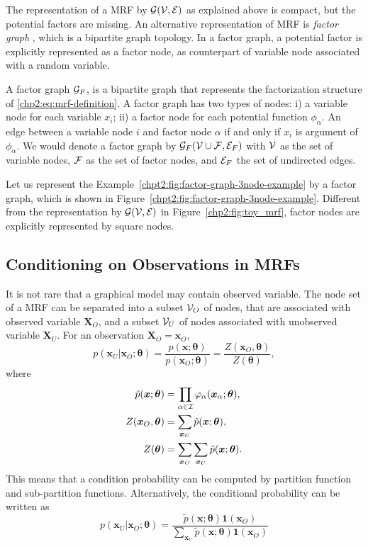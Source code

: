The representation of a MRF by $\mathcal{G}(\mathcal{V}, \mathcal{E})$ as explained above is compact, but the potential factors are missing. An alternative representation of MRF is \textit{factor graph} \cite{kschischang2001factor_graph},
which is a bipartite graph topology. In a factor graph, a potential factor is explicitly represented as a factor node, as counterpart of variable node associated with a random variable.
\begin{definition}\label{chpt2:def:factor-graph}
  A factor graph $\mathcal{G}_F$, is a bipartite graph that represents the factorization structure of \eqref{chp2:eq:mrf-definition}. A factor graph has two types of nodes: i) a variable node for each variable $x_i$; ii) a factor node for each potential function $\phi_{\alpha}$. An edge between a variable node $i$ and factor node $\alpha$ if and only if $x_i$ is argument of $\phi_{\alpha}$. We would denote a factor graph by $\mathcal{G}_F(\mathcal{V} \cup \mathcal{F}, \mathcal{E}_F)$ with $\mathcal{V}$ as the set of variable nodes, $\mathcal{F}$ as the set of factor nodes, and $\mathcal{E}_F$ the set of undirected edges.
\end{definition}
\begin{example}
  Let us represent the Example~\ref{chpt2:fig:factor-graph-3node-example} by a factor graph, which is shown in Figure~\ref{chpt2:fig:factor-graph-3node-example}. Different from the representation by $\mathcal{G}(\mathcal{V}, \mathcal{E})$ in Figure~\ref{chp2:fig:toy_mrf}, factor nodes are explicitly represented by square nodes.
\end{example}


\subsection{Conditioning on Observations in MRFs}
It is not rare that a graphical model may contain observed variable. The node set of a MRF can be separated into a subset $\mathcal{V}_O$ of nodes, that are associated with observed variable $\bm{X}_O$, and a subset $\mathcal{V}_U$ of nodes associated with unobserved variable $\bm{X}_U$. For an observation $\bm{X}_O=\bm{x}_O$,
\begin{equation}
  p(\bm{x}_U|\bm{x}_O;\bm{\theta}) = \frac{p(\bm{x}; \bm{\theta})}{p(\bm{x}_O;\bm{\theta})} =  \frac{Z(\bm{x}_O,\bm{\theta})}{Z(\bm{\theta})},
\end{equation}
where 
\begin{align}
  \tilde{p}(\bm{x}; \bm{\theta}) &= \prod_{\alpha \in \mathcal{I}} \varphi_{\alpha}(\bm{x}_{\alpha};\bm{\theta}), \nonumber \\
  Z(\bm{x}_O, \bm{\theta}) &= \sum_{\bm{x}_U} \tilde{p}(\bm{x}; \bm{\theta}), \nonumber \\
  Z(\bm{\theta}) &= \sum_{\bm{x}_O}\sum_{\bm{x}_U} \tilde{p}(\bm{x}; \bm{\theta}).
\end{align}
This means that a condition probability can be computed by partition function and sub-partition functions. Alternatively, the conditional probability can be written as
\begin{equation}
  p(\bm{x}_U|\bm{x}_O;\bm{\theta}) = \frac{\tilde{p}(\bm{x}; \bm{\theta})\bm{1}(\bm{x}_O)}{\sum_{\bm{x}_U}\tilde{p}(\bm{x}; \bm{\theta})\bm{1}(\bm{x}_O)}
\end{equation}


